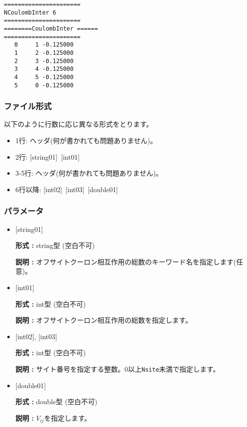 \begin{minipage}{12.5cm}
\begin{screen}
\begin{verbatim}
====================== 
NCoulombInter 6  
====================== 
========CoulombInter ====== 
====================== 
   0     1 -0.125000
   1     2 -0.125000
   2     3 -0.125000
   3     4 -0.125000
   4     5 -0.125000
   5     0 -0.125000
\end{verbatim}
\end{screen}
\end{minipage}

\subsubsection{ファイル形式}
以下のように行数に応じ異なる形式をとります。
 \begin{itemize}
   \item  1行:  ヘッダ(何が書かれても問題ありません)。
   \item  2行:   [string01]~[int01]
   \item  3-5行:  ヘッダ(何が書かれても問題ありません)。
   \item  6行以降:
   [int02]~[int03]~[double01] 
  \end{itemize}
\subsubsection{パラメータ}
 \begin{itemize}

   \item  $[$string01$]$
   
    {\bf 形式 :} string型 (空白不可)

   {\bf 説明 :} オフサイトクーロン相互作用の総数のキーワード名を指定します(任意)。

   \item  $[$int01$]$
   
    {\bf 形式 :} int型 (空白不可)

   {\bf 説明 :} オフサイトクーロン相互作用の総数を指定します。

  \item  $[$int02$]$, $[$int03$]$
  
 {\bf 形式 :} int型 (空白不可)

{\bf 説明 :} サイト番号を指定する整数。0以上\verb|Nsite|{未満}で指定します。
 
 \item  $[$double01$]$
   
   {\bf 形式 :} double型 (空白不可)

  {\bf 説明 :}  $V_{ij}$を指定します。
  
\end{itemize}

